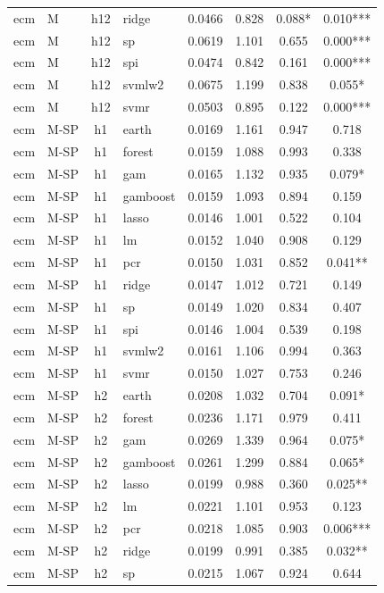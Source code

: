 \begin{ThreePartTable}
\begin{longtable}[t]{llclcccc}
ecm & M & h12 & ridge & 0.0466 & 0.828 & 0.088* & 0.010***\\
ecm & M & h12 & sp & 0.0619 & 1.101 & 0.655 & 0.000***\\
ecm & M & h12 & spi & 0.0474 & 0.842 & 0.161 & 0.000***\\
ecm & M & h12 & svmlw2 & 0.0675 & 1.199 & 0.838 & 0.055*\\
ecm & M & h12 & svmr & 0.0503 & 0.895 & 0.122 & 0.000***\\
\addlinespace
ecm & M-SP & h1 & earth & 0.0169 & 1.161 & 0.947 & 0.718\\
ecm & M-SP & h1 & forest & 0.0159 & 1.088 & 0.993 & 0.338\\
ecm & M-SP & h1 & gam & 0.0165 & 1.132 & 0.935 & 0.079*\\
ecm & M-SP & h1 & gamboost & 0.0159 & 1.093 & 0.894 & 0.159\\
ecm & M-SP & h1 & lasso & 0.0146 & 1.001 & 0.522 & 0.104\\
ecm & M-SP & h1 & lm & 0.0152 & 1.040 & 0.908 & 0.129\\
ecm & M-SP & h1 & pcr & 0.0150 & 1.031 & 0.852 & 0.041**\\
ecm & M-SP & h1 & ridge & 0.0147 & 1.012 & 0.721 & 0.149\\
ecm & M-SP & h1 & sp & 0.0149 & 1.020 & 0.834 & 0.407\\
ecm & M-SP & h1 & spi & 0.0146 & 1.004 & 0.539 & 0.198\\
ecm & M-SP & h1 & svmlw2 & 0.0161 & 1.106 & 0.994 & 0.363\\
ecm & M-SP & h1 & svmr & 0.0150 & 1.027 & 0.753 & 0.246\\
\addlinespace
ecm & M-SP & h2 & earth & 0.0208 & 1.032 & 0.704 & 0.091*\\
ecm & M-SP & h2 & forest & 0.0236 & 1.171 & 0.979 & 0.411\\
ecm & M-SP & h2 & gam & 0.0269 & 1.339 & 0.964 & 0.075*\\
ecm & M-SP & h2 & gamboost & 0.0261 & 1.299 & 0.884 & 0.065*\\
ecm & M-SP & h2 & lasso & 0.0199 & 0.988 & 0.360 & 0.025**\\
ecm & M-SP & h2 & lm & 0.0221 & 1.101 & 0.953 & 0.123\\
ecm & M-SP & h2 & pcr & 0.0218 & 1.085 & 0.903 & 0.006***\\
ecm & M-SP & h2 & ridge & 0.0199 & 0.991 & 0.385 & 0.032**\\
ecm & M-SP & h2 & sp & 0.0215 & 1.067 & 0.924 & 0.644\\

\end{longtable}
\end{ThreePartTable}

